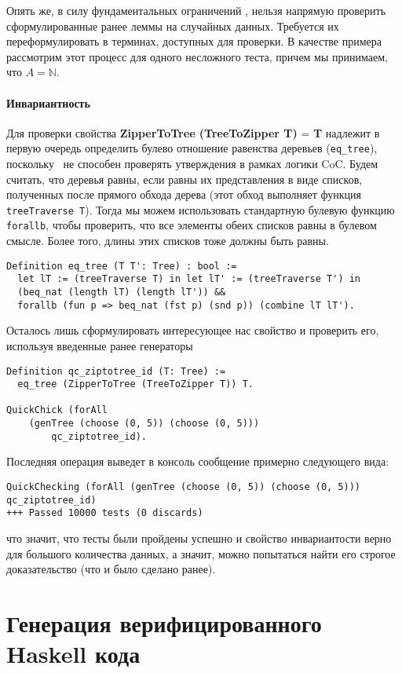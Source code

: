 Опять же, в силу фундаментальных ограничений \tqc, нельзя напрямую проверить сформулированные ранее леммы на случайных данных. Требуется их переформулировать в терминах, доступных для проверки. В качестве примера рассмотрим этот процесс для одного несложного теста, причем мы принимаем, что $A = \mathbb{N}$.

\paragraph{Инвариантность} Для проверки свойства \textbf{ZipperToTree (TreeToZipper T)} = \textbf{T} надлежит в первую очередь определить булево отношение равенства деревьев (\texttt{eq\_tree}), поскольку \tqc~не способен проверять утверждения в рамках логики CoC. Будем считать, что деревья равны, если равны их представления в виде списков, полученных после прямого обхода дерева (этот обход выполняет функция \texttt{treeTraverse T}). Тогда мы можем использовать стандартную булевую функцию \texttt{forallb}, чтобы проверить, что все элементы обеих списков равны в булевом смысле. Более того, длины этих списков тоже должны быть равны.
\begin{Verbatim}[fontsize=\small]
Definition eq_tree (T T': Tree) : bool :=
  let lT := (treeTraverse T) in let lT' := (treeTraverse T') in
  (beq_nat (length lT) (length lT')) &&
  forallb (fun p => beq_nat (fst p) (snd p)) (combine lT lT').
\end{Verbatim}

Осталось лишь сформулировать интересующее нас свойство и проверить его, используя введенные ранее генераторы
\begin{Verbatim}[fontsize=\small]
Definition qc_ziptotree_id (T: Tree) :=
  eq_tree (ZipperToTree (TreeToZipper T)) T.
  
QuickChick (forAll
	(genTree (choose (0, 5)) (choose (0, 5)))
		qc_ziptotree_id).
\end{Verbatim}

Последняя операция выведет в консоль сообщение примерно следующего вида:
\begin{Verbatim}[fontsize=\scriptsize]
QuickChecking (forAll (genTree (choose (0, 5)) (choose (0, 5))) qc_ziptotree_id)
+++ Passed 10000 tests (0 discards)
\end{Verbatim}
что значит, что тесты были пройдены успешно и свойство инвариантости верно для большого количества данных, а значит, можно попытаться найти его строгое доказательство (что и было сделано ранее).

\section{Генерация верифицированного Haskell кода}

